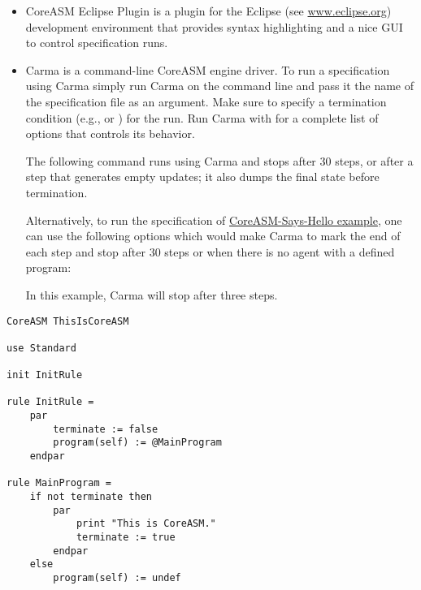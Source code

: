 \documentclass{article}
\newcommand{\CoreASM}{{\sffamily CoreASM}\xspace}
\newcommand{\Carma}{{\sffamily Carma}\xspace}
\begin{document}
\begin{itemize}
	\item \CoreASM Eclipse Plugin is a plugin for the Eclipse (see \url{www.eclipse.org}) 
		development environment that provides syntax highlighting and a nice GUI to control 
		specification runs.

	\item \Carma is a command-line \CoreASM engine driver. To run a specification using 
		\Carma simply run \Carma on the command line and pass it the name of the specification 
		file as an argument. Make sure to specify a termination condition (e.g., 
		or ) for the run.
		Run \Carma with  for a complete list of options that controls its behavior.  

		The following command runs  using \Carma and stops after 30 steps, or after
		a step that generates empty updates; it also dumps the final state before termination.

		\begin{quote} \end{quote} 

		Alternatively, to run the specification of \hyperref[spec:thisiscoreasm]{CoreASM-Says-Hello example}, one can use the following options which would make \Carma to mark the end of each step and stop after 30 steps or when there is no agent with a defined program:

		\begin{quote} \end{quote} 

		In this example, \Carma will stop after three steps.

\end{itemize}

\begin{tcolorbox}[boxrule=0.0pt,colback=gray!5!white,title={CoreASM-Says-Hello example},label={spec:thisiscoreasm}]
\begin{lstlisting}[backgroundcolor=\color{gray!5!white},frame=none]
CoreASM ThisIsCoreASM

use Standard

init InitRule

rule InitRule =
	par
		terminate := false
		program(self) := @MainProgram
	endpar

rule MainProgram =
	if not terminate then
		par
			print "This is CoreASM."
			terminate := true
		endpar
	else
		program(self) := undef
\end{lstlisting}
\end{tcolorbox}
\end{document}
